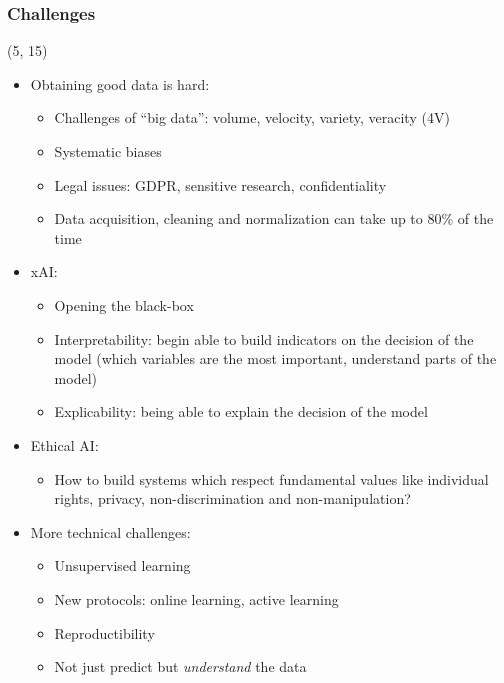 \begin{frame}
  \frametitle{Challenges}

  \begin{textblock}{90}(5, 15)
    \begin{itemize}
    \item<1-> Obtaining good data is hard:
      \begin{itemize}
      \item Challenges of ``big data'': volume, velocity, variety, veracity (4V)
      \item Systematic biases
      \item Legal issues: GDPR, sensitive research, confidentiality
      \item Data acquisition, cleaning and normalization can take up to 80\% of
        the time
      \end{itemize}
    \item<2-> \acl{xAI}:
      \begin{itemize}
      \item Opening the black-box
      \item Interpretability: begin able to build indicators on the decision of the model
        (which variables are the most important, understand parts of the model)
      \item Explicability: being able to explain the decision of the model
      \end{itemize}
    \item<3-> Ethical \ac{AI}:
      \begin{itemize}
      \item How to build systems which respect fundamental values like individual rights, privacy, non-discrimination and non-manipulation?
      \end{itemize}
    \item<4-> More technical challenges:
      \begin{itemize}
      \item Unsupervised learning
      \item New protocols: online learning, active learning
      \item Reproductibility
      \item Not just predict but \emph{understand} the data
      \end{itemize}
    \end{itemize}
  \end{textblock}
\end{frame}

